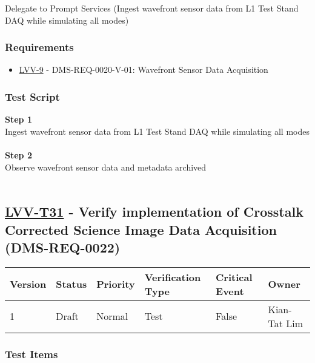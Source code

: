 Delegate to Prompt Services (Ingest wavefront sensor data from L1 Test
Stand DAQ while simulating all modes)

\hypertarget{requirements-120}{%
\subsubsection{Requirements}\label{requirements-120}}

\begin{itemize}
\tightlist
\item
  \href{https://jira.lsstcorp.org/browse/LVV-9}{LVV-9} -
  DMS-REQ-0020-V-01: Wavefront Sensor Data Acquisition
\end{itemize}

\hypertarget{test-script-120}{%
\subsubsection{Test Script}\label{test-script-120}}

\textbf{Step 1}\\
{Ingest wavefront sensor data from L1 Test Stand DAQ while simulating
all modes}\\
~\\
\textbf{Step 2}\\
Observe wavefront sensor data and metadata archived\\
~\\

\hypertarget{lvv-t31---verify-implementation-of-crosstalk-corrected-science-image-data-acquisition-dms-req-0022}{%
\subsection{\texorpdfstring{\href{https://jira.lsstcorp.org/secure/Tests.jspa\#/testCase/LVV-T31}{LVV-T31}
- Verify implementation of Crosstalk Corrected Science Image Data
Acquisition
(DMS-REQ-0022)}{LVV-T31 - Verify implementation of Crosstalk Corrected Science Image Data Acquisition (DMS-REQ-0022)}}\label{lvv-t31---verify-implementation-of-crosstalk-corrected-science-image-data-acquisition-dms-req-0022}}

\begin{longtable}[]{@{}llllll@{}}
\toprule
Version & Status & Priority & Verification Type & Critical Event &
Owner\tabularnewline
\midrule
\endhead
1 & Draft & Normal & Test & False & Kian-Tat Lim\tabularnewline
\bottomrule
\end{longtable}

\hypertarget{test-items-120}{%
\subsubsection{Test Items}\label{test-items-120}}


